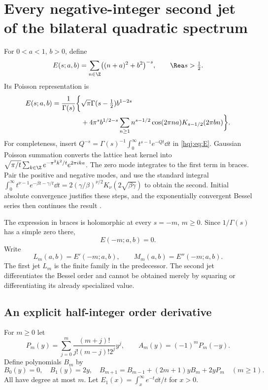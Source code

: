 \section{Every negative-integer second jet of the bilateral quadratic spectrum}
\label{hqj:sec:second}

For $0<a<1$, $b>0$, define
\begin{equation}\label{hqj:eq:E}
E(s;a,b)=\sum_{n\in\Z}\bigl((n+a)^2+b^2\bigr)^{-s},\qquad \Rea s>\tfrac12.
\end{equation}
Its Poisson representation is
\begin{align}
E(s;a,b)=\frac1{\Gamma(s)}\biggl\{&\sqrt\pi\Gamma(s-\tfrac12)b^{1-2s}
\notag\\
&+4\pi^s b^{1/2-s}\sum_{n\ge1}n^{s-1/2}\cos(2\pi na)
K_{s-1/2}(2\pi bn)\biggr\}.
\label{hqj:eq:Poisson}
\end{align}
For completeness, insert
$Q^{-s}=\Gamma(s)^{-1}\int_0^\infty t^{s-1}e^{-Qt}\dd t$
in \eqref{hqj:eq:E}. Gaussian Poisson summation converts the lattice
heat kernel into
$\sqrt{\pi/t}\sum_{k\in\Z}e^{-\pi^2k^2/t}e^{2\pi ika}$.
The zero mode integrates to the first term in braces. Pair the positive
and negative modes, and use the standard integral
$\int_0^\infty t^{\nu-1}e^{-\beta t-\gamma/t}\dd t
=2(\gamma/\beta)^{\nu/2}K_\nu(2\sqrt{\beta\gamma})$
to obtain the second. Initial absolute convergence justifies these
steps, and the exponentially convergent Bessel series then continues
the result \cite{bessel}.

The expression in braces is holomorphic at every $s=-m$, $m\ge0$.
Since $1/\Gamma(s)$ has a simple zero there,
\begin{equation}\label{hqj:eq:negative-zero}
E(-m;a,b)=0.
\end{equation}
Write
\[
L_m(a,b)=E'(-m;a,b),\qquad M_m(a,b)=E''(-m;a,b).
\]
The first jet $L_m$ is the finite family in the predecessor. The second
jet differentiates the Bessel order and cannot be obtained merely by
squaring or differentiating its already specialized value.

\subsection{An explicit half-integer order derivative}
For $m\ge0$ let
\begin{equation}\label{hqj:eq:PAB}
P_m(y)=\sum_{j=0}^m\frac{(m+j)!}{j!(m-j)!2^j}y^j,
\qquad A_m(y)=(-1)^mP_m(-y).
\end{equation}
Define polynomials $B_m$ by
\begin{equation}\label{hqj:eq:Brec}
B_0(y)=0,\quad B_1(y)=2y,\quad
B_{m+1}=B_{m-1}+(2m+1)yB_m+2yP_m\quad(m\ge1).
\end{equation}
All have degree at most $m$. Let
$E_1(x)=\int_x^\infty e^{-t}\dd t/t$ for $x>0$.


